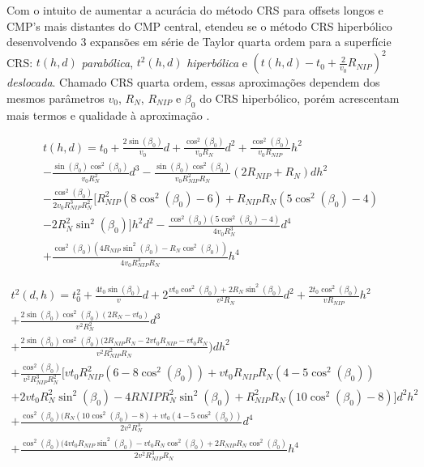 Com o intuito de aumentar a acurácia do método CRS para offsets longos e CMP's mais distantes do CMP central,
etendeu se o método CRS hiperbólico desenvolvendo 3 expansões 
em série de Taylor quarta ordem para a superfície CRS: 
$t(h,d)$ \textit{parabólica}, $t^2(h,d)$ \textit{hiperbólica} e $(t(h,d)-t_0+\frac{2}{v_0}R_{NIP})^2$
\textit{deslocada}. Chamado CRS quarta ordem, 
essas aproximações dependem dos mesmos parâmetros $v_0$, $R_N$, $R_{NIP}$ e $\beta_0$ do CRS hiperbólico,
porém acrescentam mais termos e qualidade à aproximação \cite{germam}.

\begin{multline}
\label{eq:3.11}
 t(h,d)=t_0+\frac{2\sin(\beta_0)}{v_0}d+\frac{\cos^2(\beta_0)}{v_0R_N}d^2+\frac{\cos^2(\beta_0)}{v_0R_{NIP}}h^2 \\
 -\frac{\sin(\beta_0)\cos^2(\beta_0)}{v_0R_N^2}d^3-\frac{\sin(\beta_0)\cos^2(\beta_0)}{v_0R_{NIP}^2R_N}(2R_{NIP}+R_N)dh^2 \\
 -\frac{\cos^2(\beta_0)}{2v_0R_{NIP}^3R_N^2}[R_{NIP}^2(8\cos^2(\beta_0)-6)+R_{NIP}R_N(5\cos^2(\beta_0)-4) \\
 -2R_N^2\sin^2(\beta_0)]h^2d^2-\frac{\cos^2(\beta_0)(5\cos^2(\beta_0)-4)}{4v_0R_N^3}d^4 \\
 +\frac{\cos^2(\beta_0)(4R_{NIP}\sin^2(\beta_0)-R_N\cos^2(\beta_0))}{4v_0R_{NIP}^3R_N}h^4 
\end{multline}

\begin{multline}
\label{eq:3.12}
 t^2(d,h)=t_0^2+\frac{4t_0\sin(\beta_0)}{v}d+2\frac{vt_0\cos^2(\beta_0)+2R_N\sin^2(\beta_0)}{v^2R_N}d^2+\frac{2t_0\cos^2(\beta_0)}{vR_{NIP}}h^2 \\
+\frac{2\sin(\beta_0)\cos^2(\beta_0)(2R_N-vt_0)}{v^2R_N^2}d^3 \\
+\frac{2\sin(\beta_0)\cos^2(\beta_0)(2R_{NIP}R_N-2vt_0R_{NIP}-vt_0R_N}{v^2R_{NIP}^2R_N})dh^2 \\
+\frac{\cos^2(\beta_0)}{v^2R_{NIP}^3R_N^2}[vt_0R_{NIP}^2(6-8\cos^2(\beta_0))+vt_0R_{NIP}R_N(4-5\cos^2(\beta_0)) \\
+2vt_0R_N^2\sin^2(\beta_0)-4R{NIP}R_N^2\sin^2(\beta_0)+R_{NIP}^2R_N(10\cos^2(\beta_0)-8)]d^2h^2 \\ 
+\frac{\cos^2(\beta_0)(R_N(10\cos^2(\beta_0)-8)+vt_0(4-5\cos^2(\beta_0))}{2v^2R_N^3}d^4 \\
+\frac{\cos^2(\beta_0)(4vt_0R_{NIP}\sin^2(\beta_0)-vt_0R_N\cos^2(\beta_0)+2R_{NIP}R_N\cos^2(\beta_0)}{2v^2R_{NIP}^3R_N}h^4
\end{multline}

